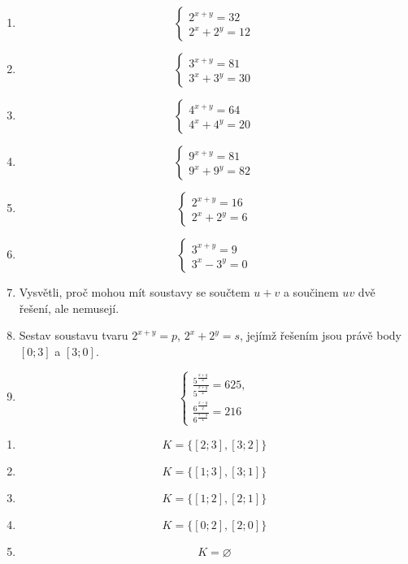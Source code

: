 \documentclass[11pt,a4paper]{article}
\begin{document}
\begin{zadaniReseniBox}[title={Domácí úkol}]
\begin{enumerate}[label=\alph*)]
\item \[\begin{cases}2^{x+y}=32\\2^x+2^y=12\end{cases}\]
\item \[\begin{cases}3^{x+y}=81\\3^x+3^y=30\end{cases}\]
\item \[\begin{cases}4^{x+y}=64\\4^x+4^y=20\end{cases}\]
\item \[\begin{cases}9^{x+y}=81\\9^x+9^y=82\end{cases}\]
\item \[\begin{cases}2^{x+y}=16\\2^x+2^y=6\end{cases}\]
\item \[\begin{cases}3^{x+y}=9\\3^x-3^y=0\end{cases}\]
\item Vysvětli, proč mohou mít soustavy se součtem $u+v$ a součinem $uv$ dvě řešení, ale nemusejí.
\item Sestav soustavu tvaru $2^{x+y}=p$, $2^x+2^y=s$, jejímž řešením jsou právě body $[0;3]$ a $[3;0]$.
\item \[ \begin{cases}\frac{5^{\frac{x+y}{2}}}{5^{\frac{x+y}{4}}}=625,\\\frac{6^{\frac{x-y}{2}}}{6^{\frac{x-y}{4}}}=216\end{cases} \]
\end{enumerate}
\tcblower
\setlength{\abovedisplayskip}{2pt}\setlength{\belowdisplayskip}{2pt}
\setlength{\abovedisplayshortskip}{2pt}\setlength{\belowdisplayshortskip}{2pt}
\begin{enumerate}[label=\alph*)]
\item \[K=\{[2;3],[3;2]\}\]
\item \[K=\{[1;3],[3;1]\}\]
\item \[K=\{[1;2],[2;1]\}\]
\item \[K=\{[0;2],[2;0]\}\]
\item \[K=\varnothing\]

\end{enumerate}
\end{zadaniReseniBox}
\end{document}

